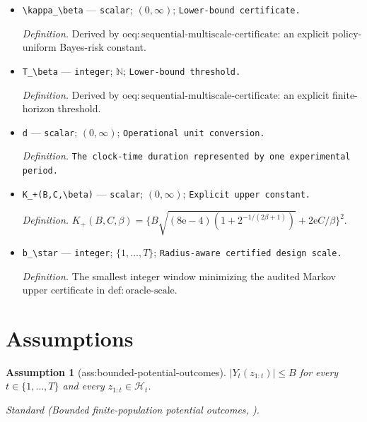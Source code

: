 \documentclass{article}
\newtheorem{assumption}{Assumption}
\begin{document}
\begin{itemize}
  \item \texttt{\textbackslash{}\allowbreak{}kappa\_\allowbreak{}\textbackslash{}\allowbreak{}beta} --- \texttt{scalar}; \((0,\infty)\); \texttt{Lower-\allowbreak{}bound certificate.}
  \par\smallskip\noindent\emph{Definition.} Derived by \(\mathrm{oeq{:}sequential\mbox{-}multiscale\mbox{-}certificate}\): an explicit policy-uniform Bayes-risk constant.
  \item \texttt{T\_\allowbreak{}\textbackslash{}\allowbreak{}beta} --- \texttt{integer}; \(\mathbb N\); \texttt{Lower-\allowbreak{}bound threshold.}
  \par\smallskip\noindent\emph{Definition.} Derived by \(\mathrm{oeq{:}sequential\mbox{-}multiscale\mbox{-}certificate}\): an explicit finite-horizon threshold.
  \item \texttt{d} --- \texttt{scalar}; \((0,\infty)\); \texttt{Operational unit conversion.}
  \par\smallskip\noindent\emph{Definition.} \texttt{The clock-\allowbreak{}time duration represented by one experimental period.}
  \item \texttt{K\_\allowbreak{}+\allowbreak{}(B,\allowbreak{}C,\allowbreak{}\textbackslash{}\allowbreak{}beta)} --- \texttt{scalar}; \((0,\infty)\); \texttt{Explicit upper constant.}
  \par\smallskip\noindent\emph{Definition.} \(K_+(B,C,\beta)=\{B\sqrt{(8\mathrm e-4)(1+2^{-1/(2\beta+1)})}+2\mathrm e C/\beta\}^2\).
  \item \texttt{b\_\allowbreak{}\textbackslash{}\allowbreak{}star} --- \texttt{integer}; \(\{1,\ldots,T\}\); \texttt{Radius-\allowbreak{}aware certified design scale.}
  \par\smallskip\noindent\emph{Definition.} The smallest integer window minimizing the audited Markov upper certificate in \(\mathrm{def{:}oracle\mbox{-}scale}\).
\end{itemize}

\section{Assumptions}

\begin{assumption}[ass:bounded-potential-outcomes]\label{ass:bounded-potential-outcomes}
\(\lvert Y_t(z_{1:t})\rvert\le B\) for every \(t\in\{1,\ldots,T\}\) and every \(z_{1:t}\in\mathcal H_t\).
\par\smallskip\noindent\emph{Standard} (Bounded finite-population potential outcomes, \cite{bojinov2023design}).
\end{assumption}
\end{document}
